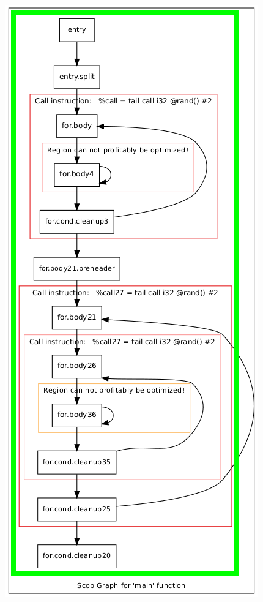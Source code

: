 \documentclass[aspectratio=169, xcolor=dvipsnames]{beamer}
\begin{document}
{
    \begin{frame}
        \vspace*{-1.5cm}
        \centering
        \includegraphics[height=1.2\textheight]{gfx/matmulScops(1).png}
    \end{frame}
    \begin{frame}

\end{frame}}
\end{document}
